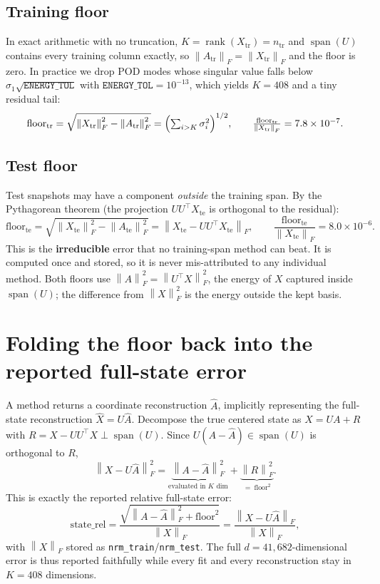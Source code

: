 \documentclass[11pt]{article}
\newcommand{\Xtr}{X_{\mathrm{tr}}}
\newcommand{\Xte}{X_{\mathrm{te}}}
\newcommand{\Atr}{A_{\mathrm{tr}}}
\newcommand{\Ate}{A_{\mathrm{te}}}
\newcommand{\floortr}{\mathrm{floor}_{\mathrm{tr}}}
\newcommand{\floorte}{\mathrm{floor}_{\mathrm{te}}}
\newcommand{\Fnorm}[1]{\left\lVert#1\right\rVert_F}
\newcommand{\code}[1]{\texttt{#1}}
\DeclareMathOperator{\rank}{rank}
\DeclareMathOperator{\spanop}{span}
\begin{document}
\subsection{Training floor}
In exact arithmetic with no truncation, $K=\rank(\Xtr)=n_{\mathrm{tr}}$ and
$\spanop(U)$ contains every training column exactly, so $\Fnorm{\Atr}=\Fnorm{\Xtr}$
and the floor is zero. In practice we drop POD modes whose singular value falls
below $\sigma_1\sqrt{\texttt{ENERGY\_TOL}}$ with $\texttt{ENERGY\_TOL}=10^{-13}$,
which yields $K=408$ and a tiny residual tail:
\begin{equation}
\floortr = \sqrt{\Fnorm{\Xtr}^2 - \Fnorm{\Atr}^2}
         = \Bigl(\textstyle\sum_{i>K}\sigma_i^2\Bigr)^{1/2},
\qquad
\frac{\floortr}{\Fnorm{\Xtr}} = 7.8\times10^{-7}.
\end{equation}

\subsection{Test floor}
Test snapshots may have a component \emph{outside} the training span. By the
Pythagorean theorem (the projection $UU^\top\Xte$ is orthogonal to the residual):
\begin{equation}
\floorte = \sqrt{\Fnorm{\Xte}^2 - \Fnorm{\Ate}^2}
         = \Fnorm{\Xte - UU^\top \Xte},
\qquad
\frac{\floorte}{\Fnorm{\Xte}} = 8.0\times10^{-6}.
\end{equation}
This is the \textbf{irreducible} error that no training-span method can beat. It is
computed once and stored, so it is never mis-attributed to any individual method.
Both floors use $\Fnorm{A}^2=\Fnorm{U^\top X}^2$, the energy of $X$ captured inside
$\spanop(U)$; the difference from $\Fnorm{X}^2$ is the energy outside the kept basis.

\section{Folding the floor back into the reported full-state error}
A method returns a coordinate reconstruction $\hat A$, implicitly representing the
full-state reconstruction $\hat X = U\hat A$. Decompose the true centered state as
$X = UA + R$ with $R = X - UU^\top X \perp \spanop(U)$. Since
$U(A-\hat A)\in\spanop(U)$ is orthogonal to $R$,
\begin{equation}
\Fnorm{X - U\hat A}^2
  = \underbrace{\Fnorm{A-\hat A}^2}_{\text{evaluated in }K\text{ dim}}
  + \underbrace{\Fnorm{R}^2}_{=\ \mathrm{floor}^2}.
\end{equation}
This is exactly the reported relative full-state error:
\begin{equation}
\text{state\_rel}
  = \frac{\sqrt{\Fnorm{A-\hat A}^2 + \mathrm{floor}^2}}{\Fnorm{X}}
  = \frac{\Fnorm{X - U\hat A}}{\Fnorm{X}},
\end{equation}
with $\Fnorm{X}$ stored as \code{nrm\_train}/\code{nrm\_test}. The full
$d=41{,}682$-dimensional error is thus reported faithfully while every fit and
every reconstruction stay in $K=408$ dimensions.
\end{document}
